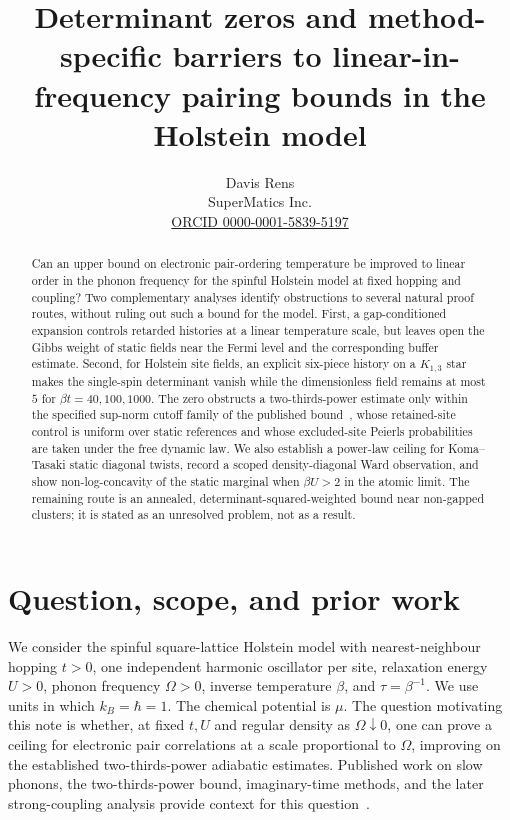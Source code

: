 \documentclass[11pt]{article}
\title{Determinant zeros and method-specific barriers to linear-in-frequency pairing bounds in the Holstein model}
\author{Davis Rens\\SuperMatics Inc.\\\href{https://orcid.org/0000-0001-5839-5197}{ORCID 0000-0001-5839-5197}}
\date{\smash{\parbox{.98\linewidth}{\centering\scriptsize
\ifstaged{\BARRIERSPAPERDOI}{Article DOI: \expandafter\DOI\expandafter{\BARRIERSPAPERDOI}\quad}{}
\ifstaged{\BARRIERSSUPPDOI}{Supplement DOI: \expandafter\DOI\expandafter{\BARRIERSSUPPDOI}}{}\\
\ifstaged{\BARRIERSREPO}{Source repository: \expandafter\url\expandafter{\BARRIERSREPO}}{}
}}}
\theoremstyle{definition}
\theoremstyle{remark}
\begin{document}
\maketitle

\begin{abstract}
Can an upper bound on electronic pair-ordering temperature be improved to linear order in the phonon frequency for the spinful Holstein model at fixed hopping and coupling? Two complementary analyses identify obstructions to several natural proof routes, without ruling out such a bound for the model. First, a gap-conditioned expansion controls retarded histories at a linear temperature scale, but leaves open the Gibbs weight of static fields near the Fermi level and the corresponding buffer estimate. Second, for Holstein site fields, an explicit six-piece history on a $K_{1,3}$ star makes the single-spin determinant vanish while the dimensionless field remains at most $5$ for $\beta t=40,100,1000$. The zero obstructs a two-thirds-power estimate only within the specified sup-norm cutoff family of the published bound~\cite{linear4}, whose retained-site control is uniform over static references and whose excluded-site Peierls probabilities are taken under the free dynamic law. We also establish a power-law ceiling for Koma--Tasaki static diagonal twists, record a scoped density-diagonal Ward observation, and show non-log-concavity of the static marginal when $\beta U>2$ in the atomic limit. The remaining route is an annealed, determinant-squared-weighted bound near non-gapped clusters; it is stated as an unresolved problem, not as a result.
\end{abstract}

\section{Question, scope, and prior work}

We consider the spinful square-lattice Holstein model with nearest-neighbour hopping $t>0$, one independent harmonic oscillator per site, relaxation energy $U>0$, phonon frequency $\Omega>0$, inverse temperature $\beta$, and $\tau=\beta^{-1}$. We use units in which $k_B=\hbar=1$. The chemical potential is $\mu$. The question motivating this note is whether, at fixed $t,U$ and regular density as $\Omega\downarrow0$, one can prove a ceiling for electronic pair correlations at a scale proportional to $\Omega$, improving on the established two-thirds-power adiabatic estimates. Published work on slow phonons, the two-thirds-power bound, imaginary-time methods, and the later strong-coupling analysis provide context for this question~\cite{slow,linear4,linear5,stage6}.
\end{document}

